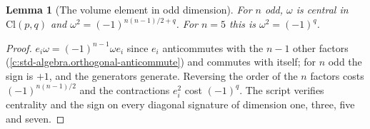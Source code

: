 \documentclass[11pt]{article}
\newtheorem{lemma}[theorem]{Lemma}
\theoremstyle{definition}
\theoremstyle{plain}
\providecommand{\Cl}{}\renewcommand{\Cl}{\mathrm{Cl}}
\begin{document}
\begin{lemma}[The volume element in odd dimension]\label{c:odd-extensions.volume-element-odd-dimension}
For $n$ odd, $\omega$ is central in $\Cl(p,q)$ and $\omega^{2} = (-1)^{n(n-1)/2 + q}$. For $n = 5$ this is $\omega^{2} = (-1)^{q}$.
\end{lemma}
\begin{proof}
$e_{i}\omega = (-1)^{n-1}\omega e_{i}$ since $e_{i}$ anticommutes with the $n - 1$ other factors (\ref{c:std-algebra.orthogonal-anticommute}) and commutes with itself; for $n$ odd the sign is $+1$, and the generators generate. Reversing the order of the $n$ factors costs $(-1)^{n(n-1)/2}$ and the contractions $e_{i}^{2}$ cost $(-1)^{q}$. The script verifies centrality and the sign on every diagonal signature of dimension one, three, five and seven.

\end{proof}
\end{document}
